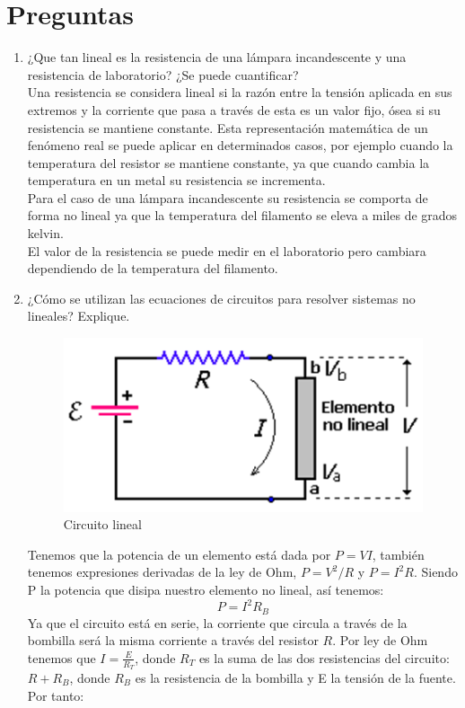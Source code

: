 \documentclass[twocolumn]{IEEEtran}
\begin{document}
\section{Preguntas}
\begin{enumerate}
 \item ¿Que  tan  lineal  es  la  resistencia  de  una  lámpara  incandescente  y  una  resistencia  de  laboratorio? ¿Se  puede  cuantificar?\\
Una resistencia se considera lineal si la razón entre la tensión aplicada en sus extremos y  la corriente que pasa a través de esta es un valor fijo, ósea si su resistencia se mantiene constante. Esta representación matemática de un fenómeno real   se puede aplicar en determinados casos, por ejemplo cuando la temperatura del resistor se mantiene constante, ya que cuando cambia la temperatura en un metal  su  resistencia se incrementa.\\
Para el caso de una lámpara incandescente su resistencia se comporta de forma no lineal ya que la temperatura del filamento se eleva a miles de grados kelvin.\\
El valor de la resistencia se puede medir en el laboratorio pero cambiara dependiendo de la temperatura del filamento.
 \item ¿Cómo se utilizan las ecuaciones de circuitos para resolver sistemas no lineales? Explique.
\begin{figure}[H]
	\centering
		\includegraphics[scale=0.5]{l1.png}
	\caption{Circuito lineal}
	\label{fig8}
\end{figure}
Tenemos que la potencia de un elemento está dada por $P=VI$, también tenemos expresiones derivadas de la ley de Ohm, $P=V^2/R$ y $P=I^2R$. Siendo P la potencia que disipa nuestro elemento no lineal, así  tenemos:
\begin{equation}
 P = I^2 R_B
\label{ecu10}
\end{equation}
\noindent
Ya que el circuito está en serie, la corriente que circula a través de la bombilla será la misma corriente a través del resistor $R$. Por ley de Ohm tenemos que  $I = \frac{E}{R_T}$, donde $R_T$ es la suma de las dos resistencias del circuito: $R + R_B$, donde $R_B$ es la resistencia de la bombilla y E la tensión de la fuente. Por tanto:

\end{enumerate}
\end{document}
